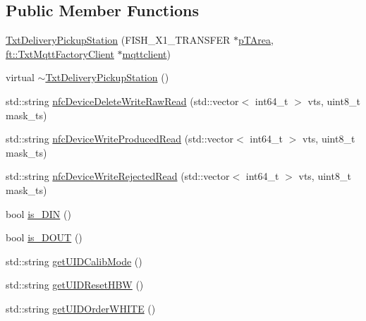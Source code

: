 \subsection*{Public Member Functions}
\begin{DoxyCompactItemize}
\item 
\hyperlink{classft_1_1_txt_delivery_pickup_station_acafb3a6e67a1dc10f4cbf8c21629bf0f}{Txt\+Delivery\+Pickup\+Station} (F\+I\+S\+H\+\_\+\+X1\+\_\+\+T\+R\+A\+N\+S\+F\+ER $\ast$\hyperlink{classft_1_1_txt_simulation_model_a9facd66a0dbecd676ae7b72c37a0b300}{p\+T\+Area}, \hyperlink{classft_1_1_txt_mqtt_factory_client}{ft\+::\+Txt\+Mqtt\+Factory\+Client} $\ast$\hyperlink{classft_1_1_txt_simulation_model_a6a92fdef8619b9b1636c7c464091ea3a}{mqttclient})
\item 
virtual \hyperlink{classft_1_1_txt_delivery_pickup_station_aa6a9fd39473743f7b1f61e46bceed3ab}{$\sim$\+Txt\+Delivery\+Pickup\+Station} ()
\item 
std\+::string \hyperlink{classft_1_1_txt_delivery_pickup_station_af67559e392ce22b20e52b36f9f0ddc16}{nfc\+Device\+Delete\+Write\+Raw\+Read} (std\+::vector$<$ int64\+\_\+t $>$ vts, uint8\+\_\+t mask\+\_\+ts)
\item 
std\+::string \hyperlink{classft_1_1_txt_delivery_pickup_station_a78b7b2f725fff8c83298a9b0c17c8001}{nfc\+Device\+Write\+Produced\+Read} (std\+::vector$<$ int64\+\_\+t $>$ vts, uint8\+\_\+t mask\+\_\+ts)
\item 
std\+::string \hyperlink{classft_1_1_txt_delivery_pickup_station_a3a1868466d61182623dfa86ffe747539}{nfc\+Device\+Write\+Rejected\+Read} (std\+::vector$<$ int64\+\_\+t $>$ vts, uint8\+\_\+t mask\+\_\+ts)
\item 
bool \hyperlink{classft_1_1_txt_delivery_pickup_station_a2379511e7da862e4ae0ec0b2aa568d05}{is\+\_\+\+D\+IN} ()
\item 
bool \hyperlink{classft_1_1_txt_delivery_pickup_station_a1b2ec468c94caef59ab92171cd5420b0}{is\+\_\+\+D\+O\+UT} ()
\item 
std\+::string \hyperlink{classft_1_1_txt_delivery_pickup_station_abc2dad3c5b2013af93f113bb90230797}{get\+U\+I\+D\+Calib\+Mode} ()
\item 
std\+::string \hyperlink{classft_1_1_txt_delivery_pickup_station_a59e7d70b08cd4c5e84e21bfa22d010af}{get\+U\+I\+D\+Reset\+H\+BW} ()
\item 
std\+::string \hyperlink{classft_1_1_txt_delivery_pickup_station_a7bf2dc1487892e8f66f2fa2b1f3d4711}{get\+U\+I\+D\+Order\+W\+H\+I\+TE} ()
\item 

\end{DoxyCompactItemize}

